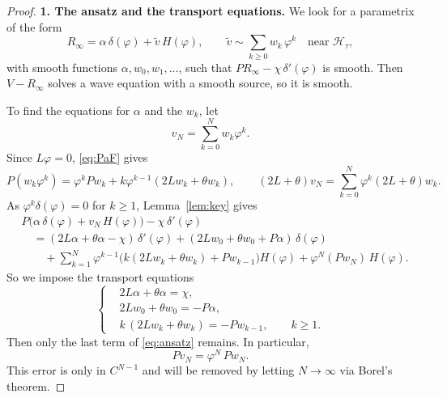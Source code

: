 \documentclass[12pt,reqno]{amsart}
\numberwithin{equation}{section}
\theoremstyle{definition}
\theoremstyle{plain}
\theoremstyle{definition}
\theoremstyle{definition}
\newcommand{\Ht}{\mathcal{H}_{\tau}}
\begin{document}
\begin{proof}
\textbf{1. The ansatz and the transport equations.}
We look for a parametrix of the form
\begin{equation}\label{def_of_parametrix_r}
R_\infty=\alpha\,\delta(\varphi)+\widetilde v\,H(\varphi),
\qquad
\widetilde v\sim\sum_{k\ge0}w_k\,\varphi^k\quad\text{near }\Ht,
\end{equation}
with smooth functions $\alpha,w_0,w_1,\dots$, such that $PR_\infty-\chi\,\delta'(\varphi)$ is smooth. Then $V-R_\infty$ solves a wave equation with a smooth source, so it is smooth.

To find the equations for $\alpha$ and the $w_k$, let
\begin{equation*}
v_N=\sum_{k=0}^Nw_k\varphi^k .
\end{equation*}
Since $L\varphi=0$, \eqref{eq:PaF} gives
\begin{equation*}
P(w_k\varphi^k)=\varphi^kPw_k+k\varphi^{k-1}(2Lw_k+\theta w_k),
\qquad
(2L+\theta)v_N=\sum_{k=0}^N\varphi^k(2L+\theta)w_k .
\end{equation*}
As $\varphi^k\delta(\varphi)=0$ for $k\ge1$, Lemma~\ref{lem:key} gives
\begin{equation}\label{eq:ansatz}
\begin{aligned}
&P\bigl(\alpha\,\delta(\varphi)+v_N\,H(\varphi)\bigr)-\chi\,\delta'(\varphi)\\
&\quad=(2L\alpha+\theta\alpha-\chi)\,\delta'(\varphi)+(2Lw_0+\theta w_0+P\alpha)\,\delta(\varphi)\\
&\qquad+\sum_{k=1}^N\varphi^{k-1}\bigl(k(2Lw_k+\theta w_k)+Pw_{k-1}\bigr)H(\varphi)+\varphi^N(Pw_N)\,H(\varphi).
\end{aligned}
\end{equation}
So we impose the transport equations
\begin{equation}\label{eq:recursion}
\left\{
\begin{aligned}
&2L\alpha+\theta\alpha=\chi,\\
&2Lw_0+\theta w_0=-P\alpha,\\
&k\,(2Lw_k+\theta w_k)=-Pw_{k-1},\qquad k\ge1.
\end{aligned}
\right.
\end{equation}
Then only the last term of \eqref{eq:ansatz} remains. In particular,
\begin{equation}\label{eq:Pwk}
Pv_N=\varphi^N\,Pw_N .
\end{equation}
This error is only in $C^{N-1}$ and will be removed by letting $N\to\infty$ via Borel's theorem.


\end{proof}
\end{document}
